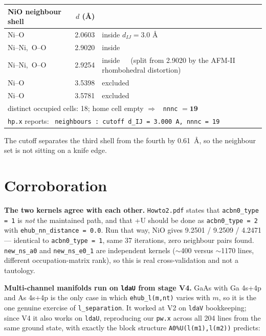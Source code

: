 \documentclass[11pt,a4paper]{article}
\newcommand{\C}[1]{\texttt{\small #1}}
\newcommand{\good}{\textcolor{accent}{\textbf{\checkmark}}}
\begin{document}
\begin{center}\small
\begin{tabular}{lrl}
\toprule
NiO neighbour shell & $d$ (\AA) & \\
\midrule
Ni--O            & 2.0603 & \textcolor{accent}{inside $d_{IJ} = 3.0$ \AA} \\
Ni--Ni,\ O--O    & 2.9020 & \textcolor{accent}{inside} \\
Ni--Ni,\ O--O    & 2.9254 & \textcolor{accent}{inside}\ \ \ {\scriptsize(split from 2.9020 by the AFM-II rhombohedral distortion)} \\
Ni--O            & 3.5398 & \textcolor{rust}{excluded} \\
Ni--O            & 3.5781 & \textcolor{rust}{excluded} \\
\midrule
\multicolumn{3}{l}{distinct occupied cells: 18; home cell empty $\Rightarrow$
\ \C{nnnc} $= \mathbf{19}$} \\
\multicolumn{3}{l}{\C{hp.x} reports: \ \C{neighbours : cutoff d_IJ = 3.000 A, nnnc = 19} \quad\good} \\
\bottomrule
\end{tabular}
\end{center}

\noindent
The cutoff separates the third shell from the fourth by 0.61~\AA, so the
neighbour set is not sitting on a knife edge.

\section{Corroboration}

\textbf{The two kernels agree with each other.} \C{Howto2.pdf} states that
\C{acbn0_type = 1} is \emph{not} the maintained path, and that +U should be done
as \C{acbn0_type = 2} with \C{ehub_nn_distance = 0.0}. Run that way, NiO gives
9.2501 / 9.2509 / 4.2471 --- identical to \C{acbn0_type = 1}, same 37 iterations,
zero neighbour pairs found. \C{new_ns_a0} and \C{new_ns_e0_1} are independent
kernels ($\sim$400 versus $\sim$1170 lines, different occupation-matrix rank),
so this is real cross-validation and not a tautology.

\smallskip
\noindent
\textbf{Multi-channel manifolds run on \C{ldaU} from stage V4.} GaAs with
Ga 4s+4p and As 4s+4p is the only case in which \C{ehub_l(m,nt)} varies with
$m$, so it is the one genuine exercise of \C{l_separation}. It worked at V2 on
\C{ldaV} bookkeeping; since V4 it also works on \C{ldaU}, reproducing our
\C{pw.x} across all 204 lines from the same ground state, with exactly the
block structure \C{A0\%U(l(m1),l(m2))} predicts:
\end{document}
